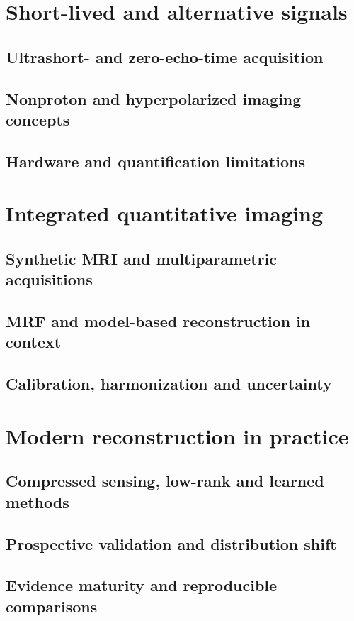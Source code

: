 \section{Short-lived and alternative signals}
\label{sec:25:short-lived-and-alternative-signals}
\subsection{Ultrashort- and zero-echo-time acquisition}
\subsection{Nonproton and hyperpolarized imaging concepts}
\subsection{Hardware and quantification limitations}

\section{Integrated quantitative imaging}
\label{sec:25:integrated-quantitative-imaging}
\subsection{Synthetic MRI and multiparametric acquisitions}
\subsection{MRF and model-based reconstruction in context}
\subsection{Calibration, harmonization and uncertainty}

\section{Modern reconstruction in practice}
\label{sec:25:modern-reconstruction-in-practice}
\subsection{Compressed sensing, low-rank and learned methods}
\subsection{Prospective validation and distribution shift}
\subsection{Evidence maturity and reproducible comparisons}


